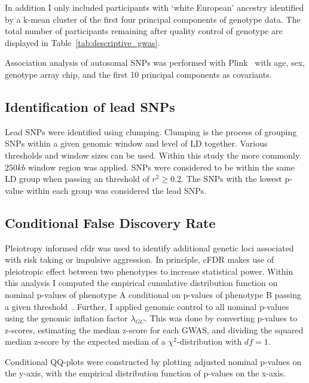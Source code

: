 In addition I only included participants with `white European' ancestry identified by a k-mean cluster of the first four principal components of genotype data.
The total number of participants remaining after quality control of genotype are displayed in Table~\ref{tab:descriptive_gwas}.

Association analysis of autosomal SNPs was performed with Plink~\cite{Purcell2007,Chang2015} with age, sex, genotype array chip, and the first 10 principal components as covariants.

\subsection{Identification of lead SNPs}
\label{sub:Clumping}

Lead SNPs were identified using clumping.
Clumping is the process of grouping SNPs within a given genomic window and level of LD together.
Various thresholds and window sizes can be used.
Within this study the more commonly $250kb$ window region was applied.
SNPs were considered to be within the same LD group when passing an threshold of $r^2 \ge 0.2$.
The SNPs with the lowest p-value within each group was considered the lead SNPs.

\subsection{Conditional False Discovery Rate}
\label{sub:conditional_false_discovery_rate}

Pleiotropy informed \acrfull{cfdr} was used to identify additional genetic loci associated with risk taking or impulsive aggression. 
In principle, cFDR makes use of pleiotropic effect between two phenotypes to increase statistical power.
Within this analysis I computed the empirical cumulative distribution function on nominal p-values of phenotype A conditional on p-values of phenotype B passing a given threshold~\cite{Andreassen2013}.
Further, I applied genomic control to all nominal p-values using the genomic inflation factor $\lambda_{GC}$.
This was done by converting p-values to z-scores, estimating the median z-score for each GWAS, and dividing the squared median z-score by the expected median of a $\chi^2$-distribution  with $df=1$.

Conditional QQ-plots were constructed by plotting adjusted nominal p-values on the y-axis, with the empirical distribution function of p-values on the x-axis.


